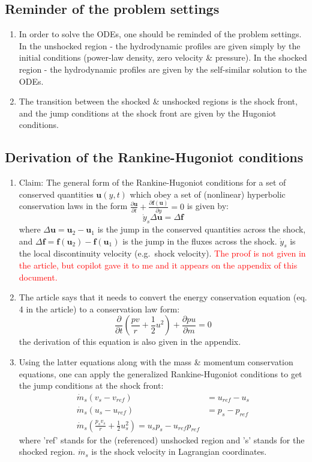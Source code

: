 \documentclass[11pt]{article}
\begin{document}
\subsection{Reminder of the problem settings}
\begin{enumerate}
  \item In order to solve the ODEs, one should be reminded of the problem settings. In the unshocked region - the hydrodynamic profiles are given simply by the initial conditions (power-law density, zero velocity \& pressure). In the shocked region - the hydrodynamic profiles are given by the self-similar solution to the ODEs.
  \item The transition between the shocked \& unshocked regions is the shock front, and the jump conditions at the shock front are given by the Hugoniot conditions.
\end{enumerate}
\subsection{Derivation of the Rankine-Hugoniot conditions}
\begin{enumerate}
  \item Claim: The general form of the Rankine-Hugoniot conditions for a set of conserved quantities $\bm{u}(y,t)$ which obey a set of (nonlinear) hyperbolic conservation laws in the form $\frac{\partial \bm{u}}{\partial t} + \frac{\partial \bm{f}(\bm{u})}{\partial y} = 0$ is given by:
  \begin{equation}
    \dot{y}_s \Delta \bm{u} = \Delta \bm{f} 
  \end{equation}
  where $\Delta \bm{u} = \bm{u}_2 - \bm{u}_1$ is the jump in the conserved quantities across the shock, and $\Delta \bm{f} = \bm{f}(\bm{u}_2) - \bm{f}(\bm{u}_1)$ is the jump in the fluxes across the shock. $\dot{y}_s$ is the local discontinuity velocity (e.g.\ shock velocity). \textcolor{red}{The proof is not given in the article, but copilot gave it to me and it appears on the appendix of this document.}
  \item The article says that it needs to convert the energy conservation equation (eq. 4 in the article) to a conservation law form:
  \begin{equation}
    \frac{\partial}{\partial t} \left(\frac{pv}{r} + \frac{1}{2} u^2\right) + \frac{\partial pu}{\partial m} = 0 
  \end{equation}
  the derivation of this equation is also given in the appendix.
  \item Using the latter equations along with the mass \& momentum conservation equations, one can apply the generalized Rankine-Hugoniot conditions to get the jump conditions at the shock front:
  \begin{align}
    \dot{m}_s (v_s - v_{ref}) &= u_{ref} - u_s \\
    \dot{m}_s (u_s - u_{ref}) &= p_{s} - p_{ref} \\
    \dot{m}_s \left(\frac{p_s v_s}{r} + \frac{1}{2} u_s^2\right) = u_s p_s - u_{ref} p_{ref}
  \end{align}
  where 'ref' stands for the (referenced) unshocked region and 's' stands for the shocked region. $\dot{m}_s$ is the shock velocity in Lagrangian coordinates.
\end{enumerate}
\end{document}
